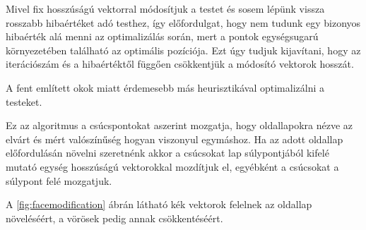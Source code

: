 Mivel fix hosszúságú vektorral módosítjuk a testet és sosem lépünk vissza rosszabb hibaértéket adó testhez, így előfordulgat, hogy nem tudunk egy bizonyos hibaérték alá menni az optimalizálás során, mert a pontok egységsugarú környezetében található az optimális pozíciója.
Ezt úgy tudjuk kijavítani, hogy az iterációszám és a hibaértéktől függően csökkentjük a módosító vektorok hosszát.

A fent említett okok miatt érdemesebb más heurisztikával optimalizálni a testeket.

\label{sect:facemodification}

Ez az algoritmus a csúcspontokat aszerint mozgatja, hogy oldallapokra nézve az elvárt és mért valószínűség hogyan viszonyul egymáshoz.
Ha az adott oldallap előfordulásán növelni szeretnénk akkor a csúcsokat lap súlypontjából kifelé mutató egység hosszúságú vektorokkal mozdítjuk el, egyébként a csúcsokat a súlypont felé mozgatjuk.

A \ref{fig:facemodification} ábrán látható kék vektorok felelnek az oldallap növeléséért, a vörösek pedig annak csökkentéséért.

